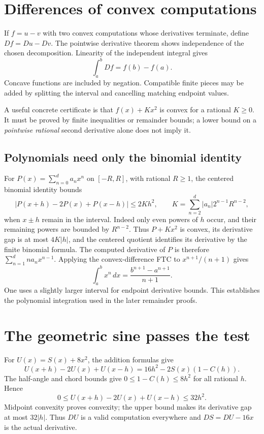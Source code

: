 \section{Differences of convex computations}
If $f=u-v$ with two convex computations whose derivatives terminate, define
$Df=Du-Dv$.  The pointwise derivative theorem shows independence of the
chosen decomposition.  Linearity of the independent integral gives
\[
 \int_a^b Df=f(b)-f(a).
\]
Concave functions are included by negation.  Compatible finite pieces may
be added by splitting the interval and cancelling matching endpoint values.

A useful concrete certificate is that $f(x)+Kx^2$ is convex for a rational
$K\ge0$.  It must be proved by finite inequalities or remainder bounds;
a lower bound on a \emph{pointwise rational} second derivative alone does
not imply it.

\subsection{Polynomials need only the binomial identity}
For $P(x)=\sum_{n=0}^d a_nx^n$ on $[-R,R]$, with rational $R\ge1$,
the centered binomial identity bounds
\[
 |P(x+h)-2P(x)+P(x-h)|\le 2K h^2,
 \qquad K=\sum_{n=2}^d |a_n|2^{n-1}R^{n-2},
\]
when $x\pm h$ remain in the interval.  Indeed only even powers of $h$
occur, and their remaining powers are bounded by $R^{n-2}$.
Thus $P+Kx^2$ is convex, its derivative gap is at most $4K|h|$, and the
centered quotient identifies its derivative by the finite binomial formula.
The computed derivative of $P$ is therefore $\sum_{n=1}^d n a_nx^{n-1}$.
Applying the convex-difference FTC to $x^{n+1}/(n+1)$ gives
\[
 \int_a^b x^n\,dx=\frac{b^{n+1}-a^{n+1}}{n+1}.
\]
One uses a slightly larger interval for endpoint derivative bounds.  This
establishes the polynomial integration used in the later remainder proofs.

\section{The geometric sine passes the test}
For $U(x)=S(x)+8x^2$, the addition formulas give
\[
 U(x+h)-2U(x)+U(x-h)
 =16h^2-2S(x)(1-C(h)).
\]
The half-angle and chord bounds give $0\le1-C(h)\le8h^2$ for all
rational $h$.  Hence
\[
 0\le U(x+h)-2U(x)+U(x-h)\le32h^2.
\]
Midpoint convexity proves convexity; the upper bound makes its derivative
gap at most $32|h|$.  Thus $DU$ is a valid computation everywhere and
$DS=DU-16x$ is the actual derivative.

